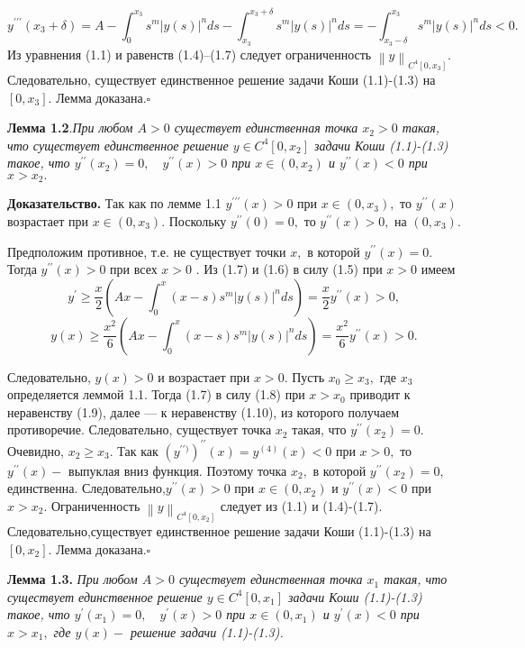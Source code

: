$$
y^{\prime\prime\prime}(x_3+\delta)=
A-\int_0^{x_3}s^m{\vert y(s) \vert}^n ds-
\int_{x_3}^{x_3+\delta}s^m{\vert y(s) \vert}^n ds=
-\int_{x_3-\delta}^{x_3}s^m{\vert y(s) \vert}^n ds<0.
$$
Из уравнения (1.1) и равенств (1.4)--(1.7) следует ограниченность
$ \left\|y\right\|_{C^4[0,x_3]} $. Следовательно, существует единственное решение
задачи Коши (1.1)-(1.3) на $ [0,x_3].$  Лемма доказана.$ \square $

{\bf Лемма 1.2}.{\it При любом $ A>0 $ существует единственная точка
$ x_2>0 $ такая, что существует единственное решение $ y \in C^4[0,x_2] $ задачи
Коши (1.1)-(1.3) такое, что $ y^{\prime\prime}(x_2)=0,\quad y^{\prime\prime}(x)>0$ 
при $ x \in (0,x_2) $ и $ y^{\prime\prime}(x)<0 $  при $ x>x_2. $ }

{\bf  Доказательство.}   Так как по лемме 1.1 
$ y^{\prime\prime\prime}(x)>0 $    при $ x \in (0,x_3),$
то $ y^{\prime\prime}(x) $ возрастает  при $ x \in (0,x_3).$
Поскольку $ y^{\prime\prime}(0)=0, $  то $ y^{\prime\prime}(x)>0, $
на  $ (0,x_3). $

Предположим противное, т.е.  не существует точки $x,$
в которой $ y^{\prime\prime}(x)=0. $ Тогда $ y^{\prime\prime}(x)>0 $
при всех $ x>0 $ . Из (1.7) и (1.6) в силу (1.5) при $ x>0 $  имеем
$$
y^{\prime}\geq \frac{x}{2}(Ax-\int_0^x (x-s)s^m{\vert y(s) \vert}^n ds)=
\frac{x}{2}y^{\prime\prime}(x)>0,
$$
$$
  y(x)\geq \frac{x^2}{6}(Ax-\int_0^x (x-s)s^m{\vert y(s) \vert}^n ds)=
\frac{x^2}{6}y^{\prime\prime}(x)>0.
$$

Следовательно, $ y(x)>0 $ и возрастает при $ x>0 $.
Пусть $ x_0\geq x_3, $ где  $ x_3 $ определяется леммой 1.1.
Тогда (1.7) в силу (1.8) при $ x>x_0 $ приводит к неравенству (1.9),
далее --- к неравенству (1.10), из которого получаем противоречие. Следовательно,
существует точка $ x_2 $ такая, что $ y^{\prime\prime}(x_2)=0. $
Очевидно, $ x_2\geq x_3. $  Так как $ (y^{\prime\prime)})^{\prime\prime}(x)=y^{(4)}(x)<0 $
при $ x>0, $  то $ y^{\prime\prime}(x)- $ выпуклая вниз функция. Поэтому
точка $ x_2, $  в которой $ y^{\prime\prime}(x_2)=0, $    единственна.
Следовательно,$ y^{\prime\prime}(x)>0 $   при $ x \in (0,x_2) $  и
$ y^{\prime\prime}(x)<0 $  при $ x>x_2. $ Ограниченность $ \left\|y\right\|_{C^4[0,x_2]} $
следует из (1.1) и (1.4)-(1.7). Следовательно,существует единственное решение задачи
Коши (1.1)-(1.3) на $ [0,x_2] $. Лемма доказана.$ \square $

{\bf Лемма 1.3.} {\it При любом $ A>0 $  существует единственная
точка $ x_1 $   такая, что существует единственное решение $ y \in C^4[0,x_1] $ задачи
Коши (1.1)-(1.3) такое, что $ y^{\prime}(x_1)=0,\quad y^{\prime}(x)>0  $    при
$ x \in (0,x_1) $ и $ y^{\prime}(x)<0 $ при $ x>x_1, $ где $ y(x)-$ решение
задачи (1.1)-(1.3).}


